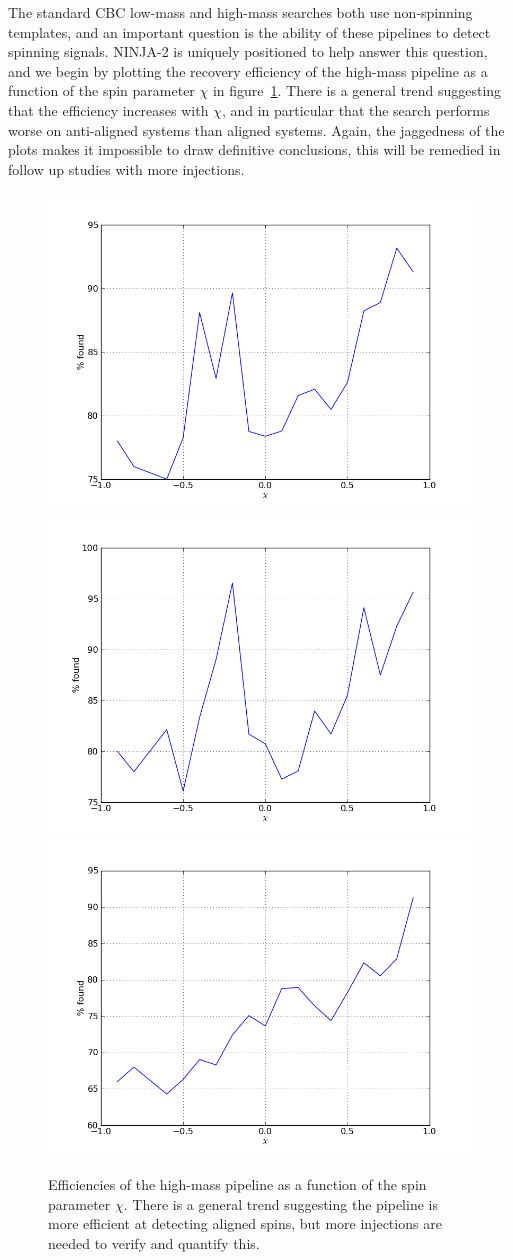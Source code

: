 The standard CBC low-mass and high-mass searches both use non-spinning
templates, and an important question is the ability of these pipelines
to detect spinning signals.  NINJA-2 is uniquely positioned to help
answer this question, and we begin by plotting the recovery efficiency
of the high-mass pipeline as a function of the spin parameter $\chi$
in figure~\ref{f:high_spin_efficiencies}.  There is a general trend
suggesting that the efficiency increases with $\chi$, and in
particular that the search performs worse on anti-aligned systems than
aligned systems.  Again, the jaggedness of the plots makes it
impossible to draw definitive conclusions, this will be remedied in
follow up studies with more injections.



\begin{figure}
  \includegraphics[width=0.5\linewidth]{figures/ninja2_results/H_second_spin_high_efficiency}
  \includegraphics[width=0.5\linewidth]{figures/ninja2_results/L_second_spin_high_efficiency} \\
  \includegraphics[width=0.5\linewidth]{figures/ninja2_results/V_second_spin_high_efficiency}
  \caption[Efficiency of the high-mass pipeline as a function of mass]{
  \label{f:high_spin_efficiencies}
Efficiencies of the high-mass pipeline as a function of the spin
parameter $\chi$.  There is a general trend suggesting the pipeline
is more efficient at detecting aligned spins, but more injections are
needed to verify and quantify this.
}
\end{figure}%


